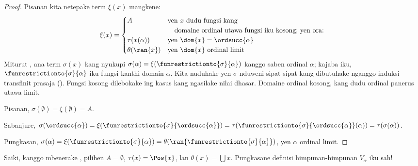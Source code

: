 \documentclass[../../../include/open-logic-section]{subfiles}
\begin{document}
\begin{proof}
Pisanan kita netepake term $\xi(x)$ mangkene:
\[
	\xi(x) = 
	\begin{cases}
			A &\text{yen $x$ dudu fungsi kang}\\
			&\hspace{1em}\text{domaine ordinal utawa fungsi iku kosong; yen ora:}\\
			\tau(x(\alpha)) & \text{yen $\dom{x} = \ordsucc{\alpha}$}\\
			\theta(\ran{x}) & \text{yen $\dom{x}$ ordinal limit}
	\end{cases}
\]
Miturut , ana term
$\sigma(x)$ kang nyukupi
$\sigma(\alpha) = \xi(\funrestrictionto{\sigma}{\alpha})$
kanggo saben ordinal $\alpha$; kajaba iku,
$\funrestrictionto{\sigma}{\alpha}$ iku fungsi
kanthi domain $\alpha$. Kita nuduhake yen $\sigma$
nduweni sipat-sipat kang dibutuhake nganggo induksi
transfinit prasaja
().
Fungsi kosong dilebokake ing kasus kang ngasilake nilai dhasar. Domaine ordinal kosong, kang dudu ordinal panerus utawa limit.

Pisanan, $\sigma(\emptyset) = \xi(\emptyset) = A$.

Sabanjure,
$\sigma(\ordsucc{\alpha}) = \xi(\funrestrictionto{\sigma}{\ordsucc{\alpha}}) = \tau(\funrestrictionto{\sigma}{\ordsucc{\alpha}}(\alpha)) = \tau(\sigma(\alpha))$.

Pungkasan,
$\sigma(\alpha) = \xi(\funrestrictionto{\sigma}{\alpha}) = \theta(\ran{\funrestrictionto{\sigma}{\alpha}})$,
yen $\alpha$ ordinal limit.
\end{proof}
\noindent
Saiki, kanggo mbenerake ,
pilihen $A = \emptyset$, $\tau(x) = \Pow{x}$,
lan $\theta(x) = \bigcup x$. Pungkasane definisi
himpunan-himpunan $V_\alpha$ iku sah!{}
\end{document}

